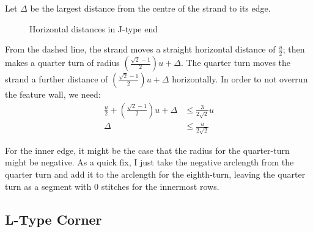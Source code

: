 \documentclass[openany]{book}
\begin{document}
Let $\Delta$ be the largest distance from the centre of the strand to its edge. 

\begin{figure}[H]\centering
{}\caption{Horizontal distances in J-type end}
\end{figure}

From the dashed line, the strand moves a straight horizontal distance of $\frac{u}{2}$; then makes a quarter turn of radius $\left(\frac{\sqrt 2 -1}{2}\right)u+\Delta$. The quarter turn moves the strand a further distance of $\left(\frac{\sqrt 2 -1}{2}\right)u+\Delta$ horizontally. In order to not overrun the feature wall, we need:
\begin{align*}
\frac{u}{2}+\left(\frac{\sqrt 2 -1}{2}\right)u+\Delta & \leq \frac{3}{2\sqrt 2}u\\
\Delta & \le \frac{u}{2\sqrt 2}
\end{align*}

For the inner edge, it might be the case that the radius for the quarter-turn might be negative. As a quick fix, I just take the negative arclength from the quarter turn and add it to the arclength for the eighth-turn, leaving the quarter turn as a segment with 0 stitches for the innermost rows.
\subsection{L-Type Corner}
\end{document}
